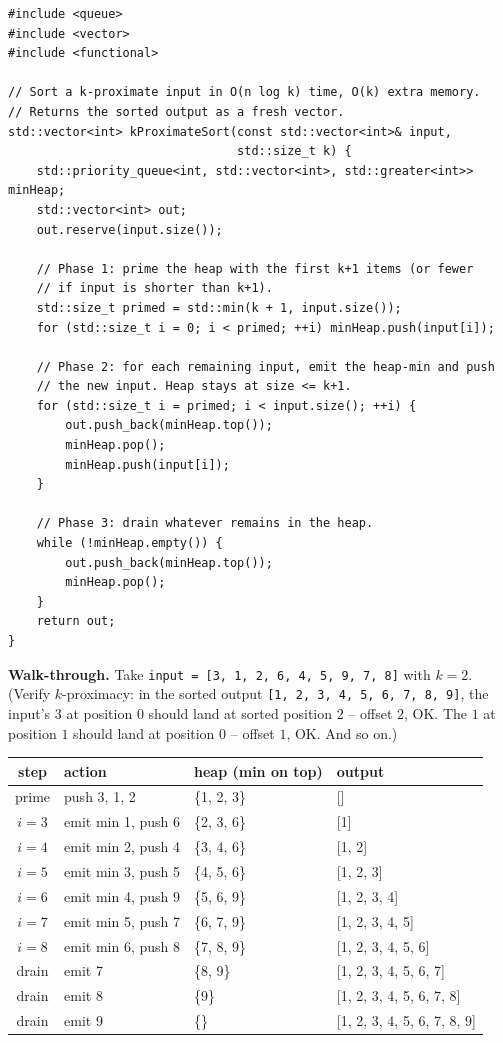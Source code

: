 \documentclass[11pt]{article}
\begin{document}
\begin{lstlisting}
#include <queue>
#include <vector>
#include <functional>

// Sort a k-proximate input in O(n log k) time, O(k) extra memory.
// Returns the sorted output as a fresh vector.
std::vector<int> kProximateSort(const std::vector<int>& input,
                                std::size_t k) {
    std::priority_queue<int, std::vector<int>, std::greater<int>> minHeap;
    std::vector<int> out;
    out.reserve(input.size());

    // Phase 1: prime the heap with the first k+1 items (or fewer
    // if input is shorter than k+1).
    std::size_t primed = std::min(k + 1, input.size());
    for (std::size_t i = 0; i < primed; ++i) minHeap.push(input[i]);

    // Phase 2: for each remaining input, emit the heap-min and push
    // the new input. Heap stays at size <= k+1.
    for (std::size_t i = primed; i < input.size(); ++i) {
        out.push_back(minHeap.top());
        minHeap.pop();
        minHeap.push(input[i]);
    }

    // Phase 3: drain whatever remains in the heap.
    while (!minHeap.empty()) {
        out.push_back(minHeap.top());
        minHeap.pop();
    }
    return out;
}
\end{lstlisting}

\textbf{Walk-through.} Take \texttt{input = [3, 1, 2, 6, 4, 5, 9, 7,
8]} with $k = 2$. (Verify $k$-proximacy: in the sorted output
\texttt{[1, 2, 3, 4, 5, 6, 7, 8, 9]}, the input's $3$ at position $0$
should land at sorted position $2$ -- offset $2$, OK. The $1$ at
position $1$ should land at position $0$ -- offset $1$, OK. And so
on.)

\begin{center}
\begin{tabular}{|c|l|l|l|}
\hline
step & action & heap (min on top) & output \\
\hline
prime & push 3, 1, 2 & \{1, 2, 3\} & [] \\
$i=3$ & emit min 1, push 6 & \{2, 3, 6\} & [1] \\
$i=4$ & emit min 2, push 4 & \{3, 4, 6\} & [1, 2] \\
$i=5$ & emit min 3, push 5 & \{4, 5, 6\} & [1, 2, 3] \\
$i=6$ & emit min 4, push 9 & \{5, 6, 9\} & [1, 2, 3, 4] \\
$i=7$ & emit min 5, push 7 & \{6, 7, 9\} & [1, 2, 3, 4, 5] \\
$i=8$ & emit min 6, push 8 & \{7, 8, 9\} & [1, 2, 3, 4, 5, 6] \\
drain & emit 7              & \{8, 9\}     & [1, 2, 3, 4, 5, 6, 7] \\
drain & emit 8              & \{9\}        & [1, 2, 3, 4, 5, 6, 7, 8] \\
drain & emit 9              & \{\}         & [1, 2, 3, 4, 5, 6, 7, 8, 9] \\
\hline
\end{tabular}
\end{center}
\end{document}
